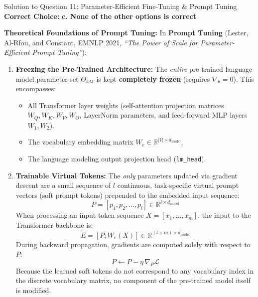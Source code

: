 \documentclass[11pt,a4paper]{article}
\begin{document}
\begin{solutionbox}{Solution to Question 11: Parameter-Efficient Fine-Tuning \& Prompt Tuning}
\textbf{Correct Choice:} \textbf{c. None of the other options is correct}

\medskip
\noindent
\textbf{Theoretical Foundations of Prompt Tuning:}
In \textbf{Prompt Tuning} (Lester, Al-Rfou, and Constant, EMNLP 2021, \textit{``The Power of Scale for Parameter-Efficient Prompt Tuning''}):
\begin{enumerate}[leftmargin=1.5em]
    \item \textbf{Freezing the Pre-Trained Architecture:} The \emph{entire} pre-trained language model parameter set $\Theta_{\text{LM}}$ is kept \textbf{completely frozen} (requires $\nabla_\theta = 0$). This encompasses:
    \begin{itemize}[leftmargin=1.5em]
        \item All Transformer layer weights (self-attention projection matrices $W_Q, W_K, W_V, W_O$, LayerNorm parameters, and feed-forward MLP layers $W_1, W_2$).
        \item The vocabulary embedding matrix $W_e \in \mathbb{R}^{|V| \times d_{\text{model}}}$.
        \item The language modeling output projection head (\texttt{lm\_head}).
    \end{itemize}
    \item \textbf{Trainable Virtual Tokens:} The \emph{only} parameters updated via gradient descent are a small sequence of $l$ continuous, task-specific virtual prompt vectors (soft prompt tokens) prepended to the embedded input sequence:
    \begin{equation*}
        P = [p_1, p_2, \dots, p_l] \in \mathbb{R}^{l \times d_{\text{model}}}
    \end{equation*}
    When processing an input token sequence $X = [x_1, \dots, x_m]$, the input to the Transformer backbone is:
    \begin{equation*}
        \tilde{E} = [P; W_e(X)] \in \mathbb{R}^{(l + m) \times d_{\text{model}}}
    \end{equation*}
    During backward propagation, gradients are computed solely with respect to $P$:
    \begin{equation*}
        P \longleftarrow P - \eta \, \nabla_P \mathcal{L}
    \end{equation*}
    Because the learned soft tokens do not correspond to any vocabulary index in the discrete vocabulary matrix, no component of the pre-trained model itself is modified.
\end{enumerate}


\end{solutionbox}
\end{document}
